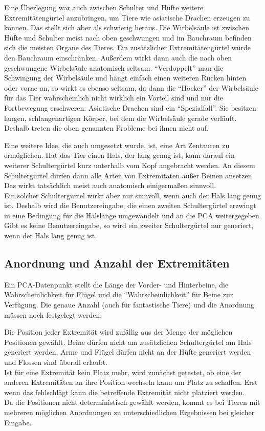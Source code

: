 Eine Überlegung war auch zwischen Schulter und Hüfte weitere Extremitätengürtel anzubringen, um \zb Tiere wie asiatische Drachen erzeugen zu können. Das stellt sich aber als schwierig heraus. Die Wirbelsäule ist zwischen Hüfte und Schulter meist nach oben geschwungen und im Bauchraum befinden sich die meisten Organe des Tieres. Ein zusätzlicher Extremitätengürtel würde den Bauchraum einschränken. Außerdem wirkt dann auch die nach oben geschwungene Wirbelsäule anatomisch seltsam.
"`Verdoppelt"' man die Schwingung der Wirbelsäule und hängt einfach einen weiteren Rücken hinten oder vorne an, so wirkt es ebenso seltsam, da dann die "`Höcker"' der Wirbelsäule für das Tier wahrscheinlich nicht wirklich ein Vorteil sind und nur die Fortbewegung erschweren.
Asiatische Drachen sind ein "`Spezialfall"'. Sie besitzen langen, schlangenartigen Körper, bei dem die Wirbelsäule gerade verläuft. Deshalb treten die oben genannten Probleme bei ihnen nicht auf.

Eine weitere Idee, die auch umgesetzt wurde, ist, eine Art Zentauren zu ermöglichen. Hat das Tier einen Hals, der lang genug ist, kann darauf ein weiterer Schultergürtel kurz unterhalb vom Kopf angebracht werden. An diesem Schultergürtel dürfen dann alle Arten von Extremitäten außer Beinen ansetzen. Das wirkt tatsächlich meist auch anatomisch einigermaßen sinnvoll.\\
Ein solcher Schultergürtel wirkt aber nur sinnvoll, wenn auch der Hals lang genug ist. Deshalb wird die Benutzereingabe, die einen zweiten Schultergürtel erzwingt in eine Bedingung für die Halslänge umgewandelt und an die PCA weitergegeben. Gibt es keine Benutzereingabe, so wird ein zweiter Schultergürtel nur generiert, wenn der Hals lang genug ist.

\subsection{Anordnung und Anzahl der Extremitäten}

Ein PCA-Datenpunkt stellt die Länge der Vorder- und Hinterbeine, die Wahrscheinlichkeit für Flügel und die "`Wahrscheinlichkeit"' für Beine zur Verfügung.
Die genaue Anzahl (auch für fantastische Tiere) und die Anordnung müssen noch festgelegt werden.

Die Position jeder Extremität wird zufällig aus der Menge der möglichen Positionen gewählt. Beine dürfen nicht am zusätzlichen Schultergürtel am Hals generiert werden, Arme und Flügel dürfen nicht an der Hüfte generiert werden und Flossen sind überall erlaubt.\\
Ist für eine Extremität kein Platz mehr, wird zunächst getestet, ob eine der anderen Extremitäten an ihre Position wechseln kann um Platz zu schaffen. Erst wenn das fehlschlägt kann die betreffende Extremität nicht platziert werden.\\
Da die Positionen nicht deterministisch gewählt werden, kommt es bei Tieren mit mehreren möglichen Anordnungen zu unterschiedlichen Ergebnissen bei gleicher Eingabe.

